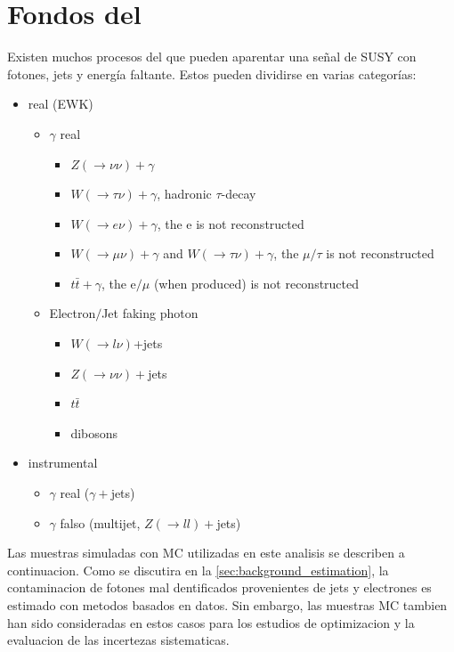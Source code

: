 \section{Fondos del {\SM}}\label{sec:bkg_samples}

Existen muchos procesos del {\SM} que pueden aparentar
una señal de SUSY con fotones, jets y energía faltante.
Estos pueden dividirse en varias categorías:

\begin{itemize}
\item {\MET} real (EWK)
  \begin{itemize}
  \item $\gamma$ real
    \begin{itemize}
    \item $Z(\to\nu\nu)+\gamma$
    \item $W(\to\tau\nu)+\gamma$, hadronic $\tau$-decay
    \item $W(\to e\nu)+\gamma$, the e is not reconstructed
    \item $W(\to\mu\nu)+\gamma$ and $W(\to\tau\nu)+\gamma$, the $\mu / \tau$ is not reconstructed
    \item $t\bar{t}+\gamma$,  the e$/ \mu$ (when produced) is not reconstructed
    \end{itemize}

  \item Electron$/$Jet faking photon
    \begin{itemize}
    \item $W(\to l\nu)$+jets
    \item $Z(\to \nu\nu)+$jets
    \item $t\bar{t}$
    \item dibosons
    \end{itemize}
  \end{itemize}

\item {\MET} instrumental
  \begin{itemize}
  \item $\gamma$ real ($\gamma+$jets)
  \item $\gamma$ falso (multijet, $Z(\to ll)+$jets)
  \end{itemize}
\end{itemize}

Las muestras simuladas con MC utilizadas en este analisis se describen
a continuacion. Como se discutira en la {\Sec} \ref{sec:background_estimation},
la contaminacion de fotones mal dentificados provenientes de jets y electrones
es estimado con metodos basados en datos. Sin embargo, las muestras MC tambien
han sido consideradas en estos casos para los estudios de optimizacion y la
evaluacion de las incertezas sistematicas.

